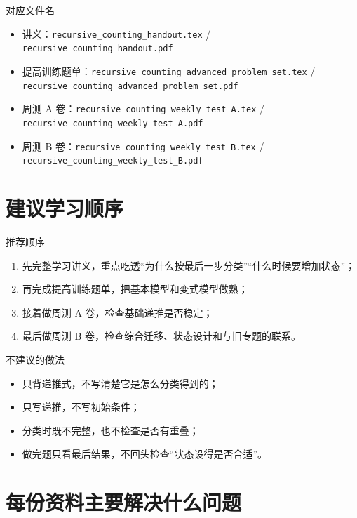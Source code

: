 \documentclass[11pt,a4paper,fontset=fandol]{ctexart}
\begin{document}
\begin{infobox}{对应文件名}
\begin{itemize}
  \item 讲义：\texttt{recursive\_counting\_handout.tex} / \texttt{recursive\_counting\_handout.pdf}
  \item 提高训练题单：\texttt{recursive\_counting\_advanced\_problem\_set.tex} / \texttt{recursive\_counting\_advanced\_problem\_set.pdf}
  \item 周测 A 卷：\texttt{recursive\_counting\_weekly\_test\_A.tex} / \texttt{recursive\_counting\_weekly\_test\_A.pdf}
  \item 周测 B 卷：\texttt{recursive\_counting\_weekly\_test\_B.tex} / \texttt{recursive\_counting\_weekly\_test\_B.pdf}
\end{itemize}
\end{infobox}

\section{建议学习顺序}

\begin{goalbox}{推荐顺序}
\begin{enumerate}
  \item 先完整学习讲义，重点吃透“为什么按最后一步分类”“什么时候要增加状态”；
  \item 再完成提高训练题单，把基本模型和变式模型做熟；
  \item 接着做周测 A 卷，检查基础递推是否稳定；
  \item 最后做周测 B 卷，检查综合迁移、状态设计和与旧专题的联系。
\end{enumerate}
\end{goalbox}

\begin{warnbox}{不建议的做法}
\begin{itemize}
  \item 只背递推式，不写清楚它是怎么分类得到的；
  \item 只写递推，不写初始条件；
  \item 分类时既不完整，也不检查是否有重叠；
  \item 做完题只看最后结果，不回头检查“状态设得是否合适”。
\end{itemize}
\end{warnbox}

\section{每份资料主要解决什么问题}
\end{document}
